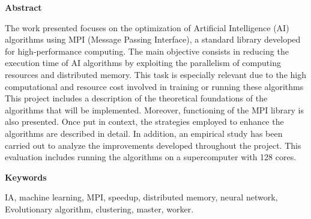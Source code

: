 
\newpage

\thispagestyle{empty}

\begin{center}

{\bf \Huge Abstract}

  \end{center}
\vspace{1cm}

The work presented focuses on the optimization of Artificial Intelligence (AI) algorithms using MPI (Message Passing Interface), a standard library developed for high-performance computing.
The main objective consists in reducing the execution time of AI algorithms by exploiting the parallelism of computing resources and distributed memory. This task is especially relevant due to the high computational and resource cost involved in training or running these algorithms
This project includes a description of the theoretical foundations of the algorithms that will be implemented. Moreover, functioning of the MPI library is also presented.
Once put in context, the strategies employed to enhance the algorithms are described in detail.
In addition, an empirical study has been carried out to analyze the improvements developed throughout the project. This evaluation includes running the algorithms on a supercomputer with 128 cores.


\vspace{1cm}


\begin{center}

{\bf \Large Keywords}

   \end{center}

   \vspace{0.5cm}
   
IA, machine learning, MPI, speedup, distributed memory, neural network, Evolutionary algorithm, clustering, master, worker.
   


